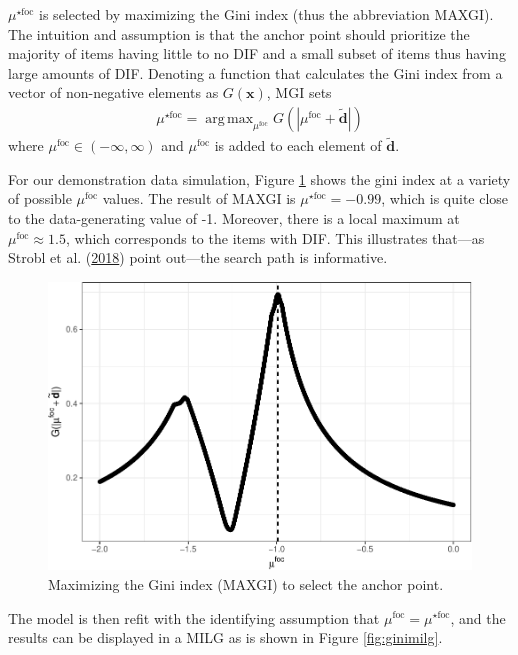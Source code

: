 \documentclass[
  11pt,
]{article}
\begin{document}
\(\mu^{\star\text{foc}}\) is selected by maximizing the Gini index (thus the abbreviation MAXGI). The intuition and assumption is that the anchor point should prioritize the majority of items having little to no DIF and a small subset of items thus having large amounts of DIF. Denoting a function that calculates the Gini index from a vector of non-negative elements as \(G(\mathbf{x})\), MGI sets
\begin{align}
\mu^{\star\text{foc}} = \mathop\mathrm{arg\,max}_{\mu^\text{foc}} G(|\mu^\text{foc} + \tilde{\mathbf{d}}|)
\end{align}
where \(\mu^\text{foc} \in (-\infty, \infty)\) and \(\mu^\text{foc}\) is added to each element of \(\tilde{\mathbf{d}}\).

For our demonstration data simulation, Figure \ref{fig:ginipath} shows the gini index at a variety of possible \(\mu^\text{foc}\) values. The result of MAXGI is \(\mu^{\star\text{foc}} = -0.99\), which is quite close to the data-generating value of -1. Moreover, there is a local maximum at \(\mu^{\text{foc}} \approx 1.5\), which corresponds to the items with DIF. This illustrates that---as Strobl et al. (\protect\hyperlink{ref-strobl2018anchor}{2018}) point out---the search path is informative.

\begin{figure}[H]

{\centering \includegraphics[width=0.7\linewidth]{paper_files/figure-latex/ginipath-1} 

}

\caption{Maximizing the Gini index (MAXGI) to select the anchor point.}\label{fig:ginipath}
\end{figure}

The model is then refit with the identifying assumption that \(\mu^{\text{foc}} = \mu^{\star\text{foc}}\), and the results can be displayed in a MILG as is shown in Figure \ref{fig:ginimilg}.
\end{document}
